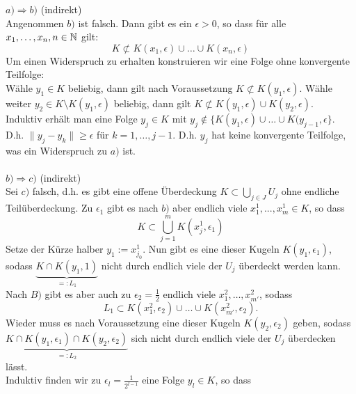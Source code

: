 \begin{beweis}
	$a) \Rightarrow  b)$ (indirekt)  \\
	Angenommen $b)$ ist falsch. Dann gibt es ein $\epsilon > 0$, so dass für alle $x_{1}, \dotsc, x_{n}, n \in \mathbb{N}$ gilt:
	\[ K \not\subset K(x_{1}, \epsilon) \cup \dotsc \cup K(x_{n}, \epsilon) \]
	Um einen Widerspruch zu erhalten konstruieren wir eine Folge ohne konvergente Teilfolge: \\
	Wähle $y_{1} \in K$ beliebig, dann gilt nach Voraussetzung $K \not\subset K(y_{1}, \epsilon)$.
	Wähle weiter $y_{2} \in K \setminus K(y_{1}, \epsilon)$ beliebig, dann gilt $K \not\subset K(y_{1}, \epsilon) \cup K(y_{2}, \epsilon)$. \\
	Induktiv erhält man eine Folge $y_{j} \in K$ mit $y_{j} \notin \{ K(y_{1}, \epsilon) \cup \dotsc \cup K(y_{j - 1}, \epsilon \}$. \\
	D.h. $\|y_{j} - y_{k} \| \geq \epsilon$ für $k = 1, \dotsc, j - 1$. D.h. $y_{j}$ hat keine konvergente Teilfolge, was ein Widerspruch zu $a)$ ist. \\ \\
	$b) \Rightarrow c)$ (indirekt) \\
	Sei $c)$ falsch, d.h. es gibt eine offene Überdeckung $K \subset \bigcup_{j \in J} U_{j}$ ohne endliche Teilüberdeckung.
	Zu $\epsilon_{1}$ gibt es nach $b)$ aber endlich viele $x_{1}^{1}, ..., x_{m}^{1} \in K$, so dass 
	\[ K \subset \bigcup_{j = 1}^{m} K(x_{j}^{1}, \epsilon_{1}) \]
	Setze der Kürze halber $y_{1} := x_{j_{0}}^{1}$. Nun gibt es eine dieser Kugeln $K(y_{1}, \epsilon_{1})$, sodass $\underbrace{K \cap K(y_{1}, 1)}_{=: L_{1}}$ nicht durch endlich viele der $U_{j}$ überdeckt werden kann. \\
	Nach $B)$ gibt es aber auch zu $\epsilon_{2} = \frac{1}{2}$ endlich viele $x_{1}^{2}, \dotsc, x_{m'}^{2}$, sodass 
	\[ L_{1} \subset K(x_{1}^{2}, \epsilon_{2}) \cup \dotsc \cup K(x_{m'}^{2}, \epsilon_{2}). \] 
	Wieder muss es nach Voraussetzung eine dieser Kugeln $K(y_{2}, \epsilon_{2})$ geben, sodass $\underbrace{K \cap K(y_{1}, \epsilon_{1}) \cap K(y_{2}, \epsilon_{2})}_{=: L_{2}}$ sich nicht durch endlich viele der $U_{j}$ überdecken lässt. \\
	Induktiv finden wir zu $\epsilon_{l} = \frac{1}{2^{l - 1}}$ eine Folge $y_{l} \in K$, so dass

\end{beweis}
